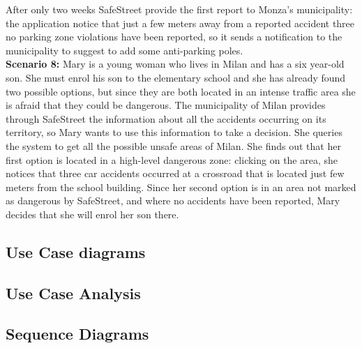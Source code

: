 \documentclass[../RASD.tex]{subfiles}
\begin{document}
    After only two weeks SafeStreet provide the first report to Monza’s municipality: the application notice that just a few meters away from a reported accident three no parking zone violations have been reported, so it sends a notification to the municipality to suggest to add some anti-parking poles.
    \\
            \textbf{Scenario 8:} Mary is a young woman who lives in Milan and has a six year-old son. She must enrol his son to the elementary school and she has already found two possible options, but since they are both located in an intense traffic area she is afraid that they could be dangerous. The municipality of Milan provides through SafeStreet the information about all the accidents occurring on its territory, so Mary wants to use this information to take a decision. She queries the system to get all the possible unsafe areas of Milan. She finds out that her first option is located in a high-level dangerous zone: clicking on the area, she notices that three car accidents occurred at a crossroad that is located just few meters from the school building. Since her second option is in an area not marked as dangerous by SafeStreet, and where no accidents have been reported, Mary decides that she will enrol her son there.
    \subsection{Use Case diagrams}\label{subsec:Use-case-diagram}
            \subsection{Use Case Analysis}\label{subsec:use-case-analysis}
                
            \subsection{Sequence Diagrams}\label{subsec:sequence-diagrams}
            \newpage
\end{document}
